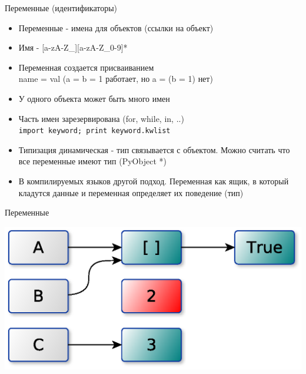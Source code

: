 \documentclass{article}
\begin{document}
\LARGE

\begin{center} Переменные (идентификаторы) \end{center}
\begin{itemize}
	\item Переменные - имена для объектов (ссылки на объект)
	\item Имя - [a-zA-Z\_][a-zA-Z\_0-9]*
	\item Переменная создается присваиванием \\ name = val (a = b = 1 работает, но a = (b = 1) нет)
	\item У одного объекта может быть много имен
	\item Часть имен зарезервирована (for, while, in, ..) \\
			\lstinline!import keyword; print keyword.kwlist!
	\item Типизация динамическая - тип связывается с объектом.
		  Можно считать что все переменные имеют тип (PyObject *)
	\item В компилируемых языков другой подход. Переменная как ящик, 
		  в который кладутся данные и переменная определяет их поведение (тип)
\end{itemize}
\newpage

\begin{center} Переменные \end{center}
\begin{center} \includegraphics{images/variables.eps} \end{center}
\newpage
\end{document}
